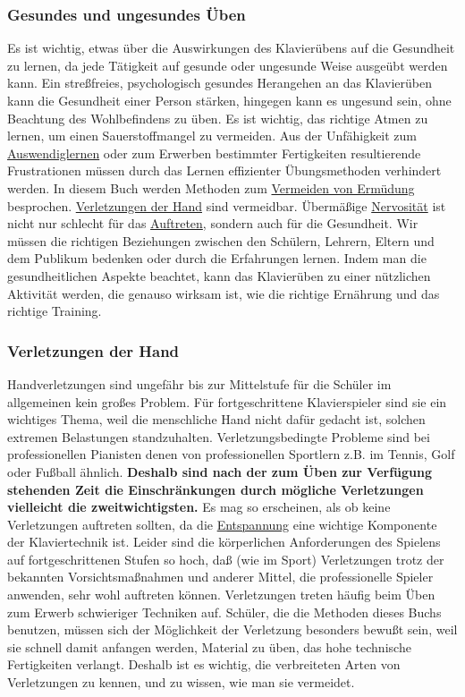 \subsubsection{Gesundes und ungesundes Üben}
\label{c1iii10ungesund}

Es ist wichtig, etwas über die Auswirkungen des Klavierübens auf die Gesundheit zu lernen, da jede Tätigkeit auf gesunde oder ungesunde Weise ausgeübt werden kann.
Ein streßfreies, psychologisch gesundes Herangehen an das Klavierüben kann die Gesundheit einer Person stärken, hingegen kann es ungesund sein, ohne Beachtung des Wohlbefindens zu üben.
Es ist wichtig, das richtige Atmen zu lernen, um einen Sauerstoffmangel zu vermeiden.
Aus der Unfähigkeit zum \hyperref[c1iii6]{Auswendiglernen} oder zum Erwerben bestimmter Fertigkeiten resultierende Frustrationen müssen durch das Lernen effizienter Übungsmethoden verhindert werden.
In diesem Buch werden Methoden zum \hyperref[c1ii14]{Vermeiden von Ermüdung} besprochen.
\hyperref[c1iii10hand]{Verletzungen der Hand} sind vermeidbar.
Übermäßige \hyperref[c1iii15]{Nervosität} ist nicht nur schlecht für das \hyperref[c1iii14]{Auftreten}, sondern auch für die Gesundheit.
Wir müssen die richtigen Beziehungen zwischen den Schülern, Lehrern, Eltern und dem Publikum bedenken oder durch die Erfahrungen lernen.
Indem man die gesundheitlichen Aspekte beachtet, kann das Klavierüben zu einer nützlichen Aktivität werden, die genauso wirksam ist, wie die richtige Ernährung und das richtige Training.


\subsubsection{Verletzungen der Hand}
\label{c1iii10hand}

Handverletzungen sind ungefähr bis zur Mittelstufe für die Schüler im allgemeinen kein großes Problem.
Für fortgeschrittene Klavierspieler sind sie ein wichtiges Thema, weil die menschliche Hand nicht dafür gedacht ist, solchen extremen Belastungen standzuhalten.
Verletzungsbedingte Probleme sind bei professionellen Pianisten denen von professionellen Sportlern z.B. im Tennis, Golf oder Fußball ähnlich.
\textbf{Deshalb sind nach der zum Üben zur Verfügung stehenden Zeit die Einschränkungen durch mögliche Verletzungen vielleicht die zweitwichtigsten.}
Es mag so erscheinen, als ob keine Verletzungen auftreten sollten, da die \hyperref[c1ii14]{Entspannung} eine wichtige Komponente der Klaviertechnik ist.
Leider sind die körperlichen Anforderungen des Spielens auf fortgeschrittenen Stufen so hoch, daß (wie im Sport) Verletzungen trotz der bekannten Vorsichtsmaßnahmen und anderer Mittel, die professionelle Spieler anwenden, sehr wohl auftreten können.
Verletzungen treten häufig beim Üben zum Erwerb schwieriger Techniken auf.
Schüler, die die Methoden dieses Buchs benutzen, müssen sich der Möglichkeit der Verletzung besonders bewußt sein, weil sie schnell damit anfangen werden, Material zu üben, das hohe technische Fertigkeiten verlangt.
Deshalb ist es wichtig, die verbreiteten Arten von Verletzungen zu kennen, und zu wissen, wie man sie vermeidet.

